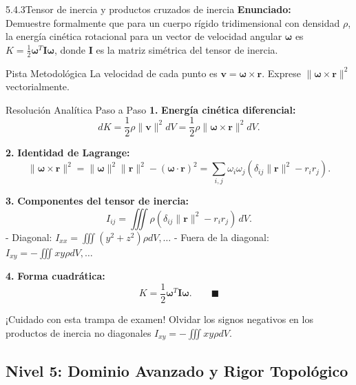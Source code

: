 \documentclass[11pt,a4paper]{article}
\begin{document}
\begin{nivelbox}{5.4.3}{Tensor de inercia y productos cruzados de inercia}
\textbf{Enunciado:}\\
Demuestre formalmente que para un cuerpo rígido tridimensional con densidad $\rho$, la energía cinética rotacional para un vector de velocidad angular $\boldsymbol{\omega}$ es $K = \frac{1}{2} \boldsymbol{\omega}^T \mathbf{I} \boldsymbol{\omega}$, donde $\mathbf{I}$ es la matriz simétrica del tensor de inercia.

\begin{observacionbox}{Pista Metodológica}
La velocidad de cada punto es $\mathbf{v} = \boldsymbol{\omega} \times \mathbf{r}$. Exprese $\|\boldsymbol{\omega} \times \mathbf{r}\|^2$ vectorialmente.
\end{observacionbox}

\begin{ejerciciobox}{Resolución Analítica Paso a Paso}
\smallskip\noindent\textbf{1.} \textbf{Energía cinética diferencial:}
\[dK = \frac{1}{2} \rho \|\mathbf{v}\|^2 dV = \frac{1}{2} \rho \|\boldsymbol{\omega} \times \mathbf{r}\|^2 dV.\]

\smallskip\noindent\textbf{2.} \textbf{Identidad de Lagrange:}
\[\|\boldsymbol{\omega} \times \mathbf{r}\|^2 = \|\boldsymbol{\omega}\|^2 \|\mathbf{r}\|^2 - (\boldsymbol{\omega} \cdot \mathbf{r})^2 = \sum_{i,j} \omega_i \omega_j \left( \delta_{ij} \|\mathbf{r}\|^2 - r_i r_j \right).\]

\smallskip\noindent\textbf{3.} \textbf{Componentes del tensor de inercia:}
\[I_{ij} = \iiint \rho ( \delta_{ij} \|\mathbf{r}\|^2 - r_i r_j ) \, dV.\]
- Diagonal: $I_{xx} = \iiint (y^2+z^2)\rho dV, \dots$
- Fuera de la diagonal: $I_{xy} = -\iiint xy \rho dV, \dots$

\smallskip\noindent\textbf{4.} \textbf{Forma cuadrática:}
\[K = \frac{1}{2} \boldsymbol{\omega}^T \mathbf{I} \boldsymbol{\omega}. \qquad \blacksquare\]
\end{ejerciciobox}

\begin{errorbox}{¡Cuidado con esta trampa de examen!}
Olvidar los signos negativos en los productos de inercia no diagonales $I_{xy} = -\iiint xy \rho dV$.
\end{errorbox}
\end{nivelbox}
\bigskip

\subsection{Nivel 5: Dominio Avanzado y Rigor Topológico}
\end{document}
